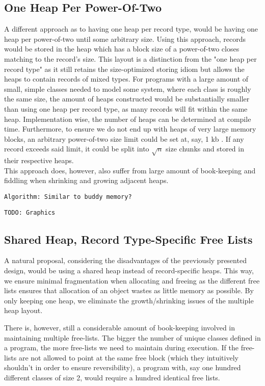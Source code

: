

\subsection{One Heap Per Power-Of-Two}
A different approach as to having one heap per record type, would be having one heap per power-of-two until some arbitrary size. Using this approach, records would be stored in the heap which has a block size of a power-of-two closes matching to the record's size. This layout is a distinction from the "one heap per record type" as it still retains the size-optimized storing idiom but allows the heaps to contain records of mixed types. For programs with a large amount of small, simple classes needed to model some system, where each class is roughly the same size, the amount of heaps constructed would be substantially smaller than using one heap per record type, as many records will fit within the same heap. Implementation wise, the number of heaps can be determined at compile time. Furthermore, to ensure we do not end up with heaps of very large memory blocks, an arbitrary power-of-two size limit could be set at, say, 1 kb . If any record exceeds said limit, it could be split into $\sqrt{n}$ size chunks and stored in their respective heaps.\\
This approach does, however, also suffer from large amount of book-keeping and fiddling when shrinking and growing adjacent heaps.

\texttt{Algorithm: Similar to buddy memory?}

\texttt{TODO: Graphics}

\subsection{Shared Heap, Record Type-Specific Free Lists}
A natural proposal, considering the disadvantages of the previously presented design, would be using a shared heap instead of record-specific heaps. 
This way, we ensure minimal fragmentation when allocating and freeing as the different free lists ensures that allocation of an object wastes as little memory as possible. By only keeping one heap, we eliminate the growth/shrinking issues of the multiple heap layout. 

There is, however, still a considerable amount of book-keeping involved in maintaining multiple free-lists. The bigger the number of unique classes defined in a program, the more free-lists we need to maintain during execution. If the free-lists are not allowed to point at the same free block (which they intuitively shouldn't in order to ensure reversibility), a program with, say one hundred different classes of size 2, would require a hundred identical free lists. 

